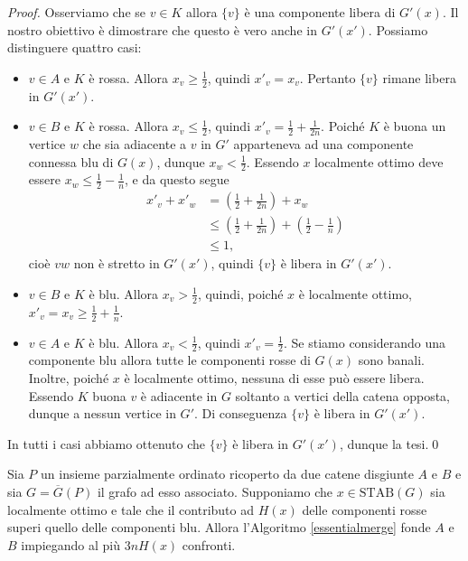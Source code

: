 \begin{proof}
  Osserviamo che se \(v\in K\) allora \(\{v\}\) è una componente libera di \(G'(x)\). Il nostro obiettivo è dimostrare che questo è vero anche in \(G'(x')\). Possiamo distinguere quattro casi: 
  \begin{itemize}
  \item \(v\in A\) e \(K\) è rossa. Allora \(x_v\ge\frac{1}{2}\), quindi \(x'_v=x_v\). Pertanto \(\{v\}\) rimane libera in \(G'(x')\). 
  \item \(v\in B\) e \(K\) è rossa. Allora \(x_v\le\frac{1}{2}\), quindi \(x'_v=\frac{1}{2}+\frac{1}{2n}\). Poiché \(K\) è buona un vertice \(w\) che sia adiacente a \(v\) in \(G'\) apparteneva ad una componente connessa blu di \(G(x)\), dunque \(x_w<\frac{1}{2}\). Essendo \(x\) localmente ottimo deve essere \(x_w\le\frac{1}{2}-\frac{1}{n}\), e da questo segue 
    \begin{align}
      x'_v+x'_w &= (\frac{1}{2} + \frac{1}{2n}) + x_w \nonumber \\
      &\le (\frac{1}{2} + \frac{1}{2n}) + (\frac{1}{2} - \frac{1}{n}) \nonumber \\
      &\le 1\text{,} \nonumber 
    \end{align}
    cioè \(vw\) non è stretto in \(G'(x')\), quindi \(\{v\}\) è libera in \(G'(x')\). 
  \item \(v\in B\) e \(K\) è blu. Allora \(x_v>\frac{1}{2}\), quindi, poiché \(x\) è localmente ottimo, \(x'_v=x_v\ge\frac{1}{2}+\frac{1}{n}\). 
  \item \(v\in A\) e \(K\) è blu. Allora \(x_v<\frac{1}{2}\), quindi \(x'_v=\frac{1}{2}\). Se stiamo considerando una componente blu allora tutte le componenti rosse di \(G(x)\) sono banali. Inoltre, poiché \(x\) è localmente ottimo, nessuna di esse può essere libera. Essendo \(K\) buona \(v\) è adiacente in \(G\) soltanto a vertici della catena opposta, dunque a nessun vertice in \(G'\). Di conseguenza \(\{v\}\) è libera in \(G'(x')\). 
  \end{itemize}
  In tutti i casi abbiamo ottenuto che \(\{v\}\) è libera in \(G'(x')\), dunque la tesi.\qed 
\end{proof}
\begin{lemma}
  \label{finallemma} Sia \(P\) un insieme parzialmente ordinato ricoperto da due catene disgiunte \(A\) e \(B\) e sia \(G=\overline{G}(P)\) il grafo ad esso associato. Supponiamo che \(x\in\text{STAB}(G)\) sia localmente ottimo e tale che il contributo ad \(H(x)\) delle componenti rosse superi quello delle componenti blu. Allora l'Algoritmo \ref{essentialmerge} fonde \(A\) e \(B\) impiegando al più \(3nH(x)\) confronti. 
\end{lemma}
